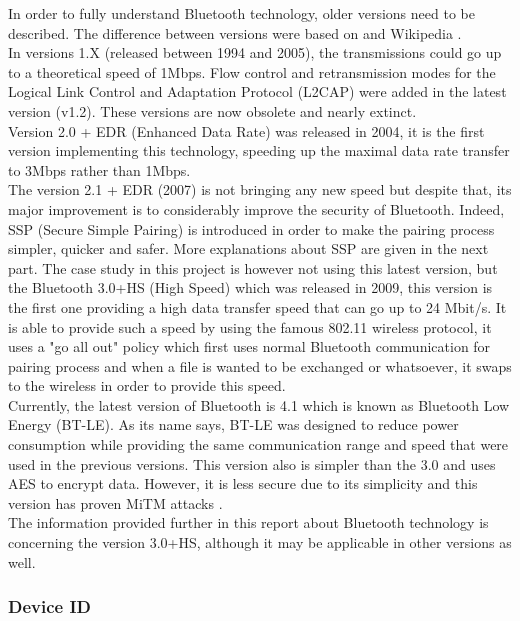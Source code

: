 In order to fully understand Bluetooth technology, older versions need to be described. The difference between versions were based on \cite{btdiff} and Wikipedia \cite{btwiki}.\\
In versions 1.X (released between 1994 and 2005), the transmissions could go up to a theoretical speed of 1Mbps. Flow control and retransmission modes for the Logical Link Control and Adaptation Protocol (L2CAP) were added in the latest version (v1.2). These versions are now obsolete and nearly extinct.\\
Version 2.0 + EDR (Enhanced Data Rate) was released in 2004, it is the first version implementing this technology, speeding up the maximal data rate transfer to 3Mbps rather than 1Mbps.\\
The version 2.1 + EDR (2007) is not bringing any new speed but despite that, its major improvement is to considerably improve the security of Bluetooth. Indeed, SSP (Secure Simple Pairing) is introduced in order to make the pairing process simpler, quicker and safer. More explanations about SSP are given in the next part.\newpage
The case study in this project is however not using this latest version, but the Bluetooth 3.0+HS (High Speed) which was released in 2009, this version is  the first one providing a high data transfer speed that can go up to 24 Mbit/s. It is able to provide such a speed by using the famous 802.11 wireless protocol, it uses a "go all out" policy which first uses normal Bluetooth communication for pairing process and when a file is wanted to be exchanged or whatsoever,  it swaps to the wireless in order to provide this speed.\\
Currently, the latest version of Bluetooth is 4.1 which is known as Bluetooth Low Energy (BT-LE). As its name says, BT-LE was designed to reduce power consumption while providing the same communication range and speed that were used in the previous versions. This version also is simpler than the 3.0 and uses AES to encrypt data. However, it is less secure due to its simplicity and this version has proven MiTM attacks \cite{hitbox_mike_ryan}.\\
The information provided further in this report about Bluetooth technology is concerning the version 3.0+HS, although it may be applicable in other versions as well.

\subsubsection{Device ID}

